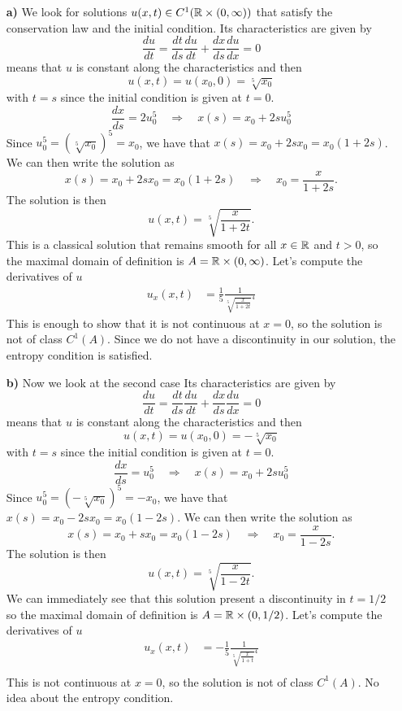\begin{enumerate}
    \item[\textbf{a)}] We look for solutions \(u(x, t) \in C^1(\mathbb{R} \times (0, \infty))\) that satisfy the conservation law and the initial condition. 
    Its characteristics are given by
    \[
        \frac{du}{dt} = \frac{dt}{ds} \frac{du}{dt} + \frac{dx}{ds} \frac{du}{dx} = 0
    \]
    means that \(u\) is constant along the characteristics and then 
    \[
        u(x,t) = u(x_0,0) = \sqrt[5]{x_0} 
    \]
    with \(t=s\) since the initial condition is given at \(t=0\). 
    \[
        \frac{dx}{ds} = 2u_0^5 \quad \Rightarrow \quad x(s) = x_0 + 2s u_0^5
    \]
    Since \(u_0^5 = (\sqrt[5]{x_0})^5 = x_0\), we have that \(x(s) = x_0 + 2s x_0 = x_0(1+2s)\). We can then write the solution as 
    \[
        x(s) = x_0 + 2s x_0 = x_0(1+2s) \quad \Rightarrow \quad x_0 = \frac{x}{1+2s}.
    \]
    The solution is then
    \[
        u(x,t) = \sqrt[5]{\frac{x}{1+2t}}.
    \]
    This is a classical solution that remains smooth for all \(x \in \mathbb{R}\) and \(t > 0\), so the maximal domain of definition is \(A = \mathbb{R} \times (0, \infty)\). Let's compute the derivatives of \(u\)
    \begin{align*}
        u_x(x,t) &= \frac{1}{5} \frac{1}{\sqrt[5]{\frac{x}{1+2t}}^4} 
    \end{align*}
    This is enough to show that it is not continuous at \(x=0\), so the solution is not of class \(C^1(A)\). Since we do not have a discontinuity in our solution, the entropy condition is satisfied.
    \item[\textbf{b)}] Now we look at the second case
    Its characteristics are given by
    \[
        \frac{du}{dt} = \frac{dt}{ds} \frac{du}{dt} + \frac{dx}{ds} \frac{du}{dx} = 0
    \]
    means that \(u\) is constant along the characteristics and then 
    \[
        u(x,t) = u(x_0,0) = -\sqrt[5]{x_0} 
    \]
    with \(t=s\) since the initial condition is given at \(t=0\). 
    \[
        \frac{dx}{ds} = u_0^5 \quad \Rightarrow \quad x(s) = x_0 + 2s u_0^5
    \]
    Since \(u_0^5 = (-\sqrt[5]{x_0})^5 = -x_0\), we have that \(x(s) = x_0 - 2s x_0 = x_0(1-2s)\). We can then write the solution as 
    \[
        x(s) = x_0 + s x_0 = x_0(1-2s) \quad \Rightarrow \quad x_0 = \frac{x}{1-2s}.
    \]
    The solution is then
    \[
        u(x,t) = \sqrt[5]{\frac{x}{1-2t}}.
    \]
    We can immediately see that this solution present a discontinuity in \(t=1/2\) so the maximal domain of definition is \(A = \mathbb{R} \times (0, 1/2)\). Let's compute the derivatives of \(u\)
        \begin{align*}
            u_x(x,t) &= -\frac{1}{5} \frac{1}{\sqrt[5]{\frac{x}{1+t}}^4} \\
        \end{align*}
    This is not continuous at \(x=0\), so the solution is not of class \(C^1(A)\). No idea about the entropy condition.
    \end{enumerate}

